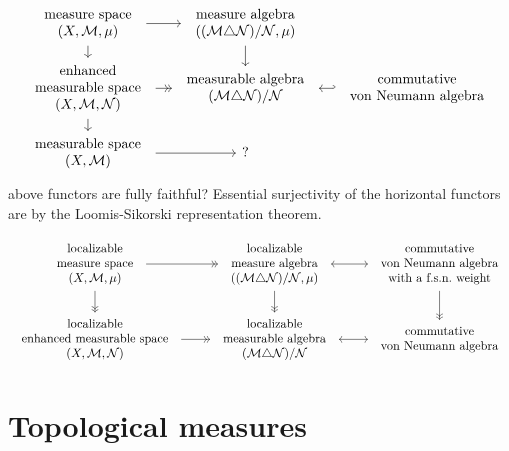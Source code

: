 \documentclass{../../large}
\begin{document}
\[\begin{tikzcd}[sep=small]
\tab{measure space\\$(X,\cM,\mu)$} \rar\dar &
\tab{measure algebra\\$((\cM\triangle\cN)/\cN,\mu)$} \dar \\
\tab{enhanced\\measurable space\\$(X,\cM,\cN)$} \rar[->>] \dar &
\tab{measurable algebra\\$(\cM\triangle\cN)/\cN$} &
\tab{commutative\\von Neumann algebra} \lar[hook']\\
\tab{measurable space\\$(X,\cM)$} \rar &?&
\end{tikzcd}\]
above functors are fully faithful?
Essential surjectivity of the horizontal functors are by the Loomis-Sikorski representation theorem.


\[\begin{tikzcd}
\tab{localizable\\measure space\\$(X,\cM,\mu)$} \rar[->>]\dar[->>] &
\tab{localizable\\measure algebra\\$((\cM\triangle\cN)/\cN,\mu)$} \dar[->>]\rar[<->] &
\tab{commutative\\von Neumann algebra\\with a f.s.n.~weight} \dar[->>] \\
\tab{localizable\\enhanced measurable space\\$(X,\cM,\cN)$} \rar[->>] &
\tab{localizable\\measurable algebra\\$(\cM\triangle\cN)/\cN$} \rar[<->] &
\tab{commutative\\von Neumann algebra}
\end{tikzcd}\]



\section{Topological measures}
\end{document}
